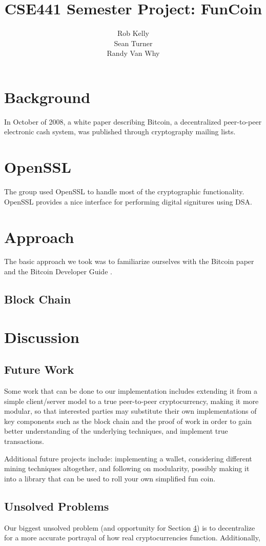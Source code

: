 \documentclass[12pt]{article}
\begin{document}
\title{CSE441 Semester Project: FunCoin}
\author{Rob Kelly\\Sean Turner\\Randy Van Why}
\maketitle

\section{Background}
In October of 2008, a white paper\cite{nakamoto:bitcoin} describing Bitcoin, a decentralized peer-to-peer electronic cash system, was published through cryptography mailing lists.

\section{OpenSSL}
The group used OpenSSL to handle most of the cryptographic functionality. OpenSSL provides a nice interface for performing digital signitures using DSA.

\section{Approach}
The basic approach we took was to familiarize ourselves with the Bitcoin paper\cite{nakamoto:bitcoin} and the Bitcoin Developer Guide \cite{dev:guide}. 

\subsection{Block Chain}

\section{Discussion}\label{future}
\subsection{Future Work}\label{work}
Some work that can be done to our implementation includes extending it from a simple client/server model to a true peer-to-peer cryptocurrency, making it more modular, so that interested parties may substitute their own implementations of key components such as the block chain and the proof of work in order to gain better understanding of the underlying techniques, and implement true transactions. 

Additional future projects include: implementing a wallet, considering different mining techniques altogether, and following on modularity, possibly making it into a library that can be used to roll your own simplified fun coin.

\subsection{Unsolved Problems}\label{unsolved}
Our biggest unsolved problem (and opportunity for Section \ref{future}) is to decentralize for a more accurate portrayal of how real cryptocurrencies function. Additionally, 



\end{document}
